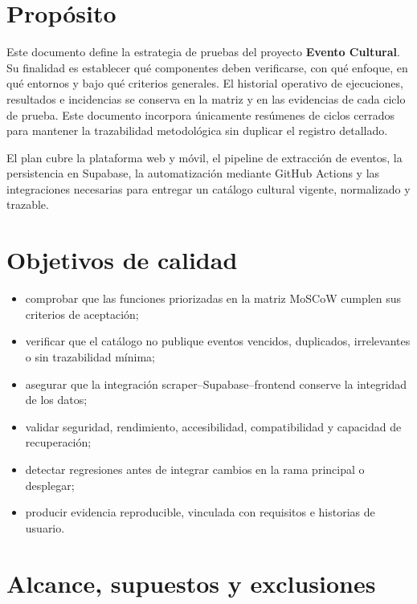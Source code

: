 \documentclass[11pt,a4paper]{article}
\begin{document}
\maketitlecapstone

\section{Propósito}

Este documento define la estrategia de pruebas del proyecto \textbf{Evento Cultural}.
Su finalidad es establecer qué componentes deben verificarse, con qué enfoque, en qué
entornos y bajo qué criterios generales. El historial operativo de ejecuciones,
resultados e incidencias se conserva en la matriz
 y en las evidencias de cada
ciclo de prueba. Este documento incorpora únicamente resúmenes de ciclos cerrados para
mantener la trazabilidad metodológica sin duplicar el registro detallado.

El plan cubre la plataforma web y móvil, el pipeline de extracción de eventos, la
persistencia en Supabase, la automatización mediante GitHub Actions y las integraciones
necesarias para entregar un catálogo cultural vigente, normalizado y trazable.

\section{Objetivos de calidad}

\begin{itemize}[leftmargin=1.5em]
  \item comprobar que las funciones priorizadas en la matriz MoSCoW cumplen sus
        criterios de aceptación;
  \item verificar que el catálogo no publique eventos vencidos, duplicados, irrelevantes
        o sin trazabilidad mínima;
  \item asegurar que la integración scraper--Supabase--frontend conserve la integridad
        de los datos;
  \item validar seguridad, rendimiento, accesibilidad, compatibilidad y capacidad de
        recuperación;
  \item detectar regresiones antes de integrar cambios en la rama principal o desplegar;
  \item producir evidencia reproducible, vinculada con requisitos e historias de usuario.
\end{itemize}

\section{Alcance, supuestos y exclusiones}
\end{document}

